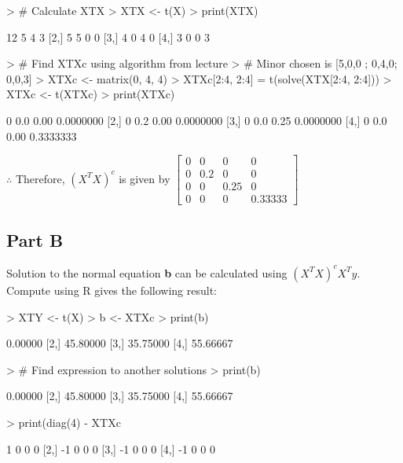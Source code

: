 \documentclass{article}
\begin{document}
\begin{Schunk}
\begin{Sinput}
> # Calculate XTX
> XTX <- t(X) %
> print(XTX)
\end{Sinput}
\begin{Soutput}
     [,1] [,2] [,3] [,4]
[1,]   12    5    4    3
[2,]    5    5    0    0
[3,]    4    0    4    0
[4,]    3    0    0    3
\end{Soutput}
\begin{Sinput}
> # Find XTXc using algorithm from lecture
> # Minor chosen is [5,0,0 ; 0,4,0; 0,0,3]
> XTXc <- matrix(0, 4, 4)
> XTXc[2:4, 2:4] = t(solve(XTX[2:4, 2:4]))
> XTXc <- t(XTXc)
> print(XTXc)
\end{Sinput}
\begin{Soutput}
     [,1] [,2] [,3]      [,4]
[1,]    0  0.0 0.00 0.0000000
[2,]    0  0.2 0.00 0.0000000
[3,]    0  0.0 0.25 0.0000000
[4,]    0  0.0 0.00 0.3333333
\end{Soutput}
\end{Schunk}

\noindent $\therefore$ Therefore, $(X^TX)^c$ is given by $\begin{bmatrix} 0 & 0 & 0 & 0 \\ 0 & 0.2 & 0 & 0 \\
0 & 0 & 0.25 & 0 \\ 0 & 0 & 0 & 0.33333 \end{bmatrix}$

\subsection{Part B}
Solution to the normal equation \textbf{b} can be calculated using $(X^TX)^cX^Ty$. Compute using R gives the following result:
\begin{Schunk}
\begin{Sinput}
> XTY <- t(X) %
> b <- XTXc %
> print(b)
\end{Sinput}
\begin{Soutput}
         [,1]
[1,]  0.00000
[2,] 45.80000
[3,] 35.75000
[4,] 55.66667
\end{Soutput}
\begin{Sinput}
> # Find expression to another solutions
> print(b)
\end{Sinput}
\begin{Soutput}
         [,1]
[1,]  0.00000
[2,] 45.80000
[3,] 35.75000
[4,] 55.66667
\end{Soutput}
\begin{Sinput}
> print(diag(4) - XTXc %
\end{Sinput}
\begin{Soutput}
     [,1] [,2] [,3] [,4]
[1,]    1    0    0    0
[2,]   -1    0    0    0
[3,]   -1    0    0    0
[4,]   -1    0    0    0
\end{Soutput}
\end{Schunk}
\end{document}
